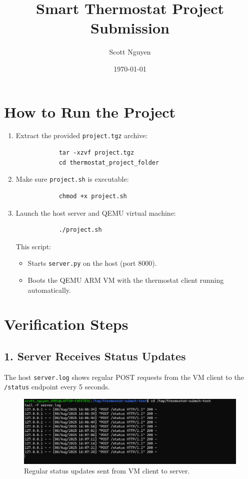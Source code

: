 \documentclass[12pt]{article}
\title{\textbf{Smart Thermostat Project Submission}}
\author{Scott Nguyen}
\date{\today}
\begin{document}
	\maketitle
	
	\section{How to Run the Project}
	\begin{enumerate}
		\item Extract the provided \texttt{project.tgz} archive:
		\begin{verbatim}
			tar -xzvf project.tgz
			cd thermostat_project_folder
		\end{verbatim}
		\item Make sure \texttt{project.sh} is executable:
		\begin{verbatim}
			chmod +x project.sh
		\end{verbatim}
		\item Launch the host server and QEMU virtual machine:
		\begin{verbatim}
			./project.sh
		\end{verbatim}
		This script:
		\begin{itemize}
			\item Starts \texttt{server.py} on the host (port 8000).
			\item Boots the QEMU ARM VM with the thermostat client running automatically.
		\end{itemize}
	\end{enumerate}
	
	\section{Verification Steps}
	\subsection{1. Server Receives Status Updates}
	The host \texttt{server.log} shows regular POST requests from the VM client to the \texttt{/status} endpoint every 5 seconds.
	\begin{figure}[h!]
		\centering
		\includegraphics[width=0.85\linewidth]{server-log.png}
		\caption{Regular status updates sent from VM client to server.}
	\end{figure}
	
\end{document}
